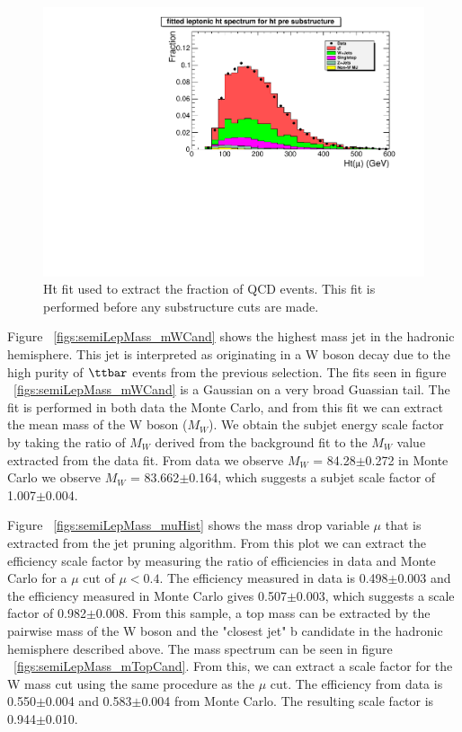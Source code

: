 \begin{figure}[htcb]
\centering
\includegraphics[width=1.0\textwidth]{figs/htLep3_comp.pdf}
\caption{Ht fit used to extract the fraction of QCD events.  This fit is performed before any substructure cuts are made.}
\label{figs:htLep3_comp}
\end{figure}


Figure ~\ref{figs:semiLepMass_mWCand} shows the highest mass jet in the hadronic hemisphere.  This jet is interpreted as originating in a W boson decay due to the
high purity of $\ttbar$ events from the previous selection.  The fits seen in figure ~\ref{figs:semiLepMass_mWCand} is a Gaussian on a very broad Guassian tail. 
The fit is performed
in both data the Monte Carlo, and from this fit we can extract the mean mass of the W boson ($M_W$).  We obtain the subjet energy scale factor by taking the 
ratio of 
$M_W$ derived from the background fit to the $M_W$ value extracted from the data fit.  From data we observe $M_W$ = 84.28$\pm$0.272 in Monte Carlo 
we observe $M_W$ = 83.662$\pm$0.164, which suggests a subjet scale factor of 1.007$\pm$0.004.

Figure ~\ref{figs:semiLepMass_muHist} shows the mass drop variable $\mu$ that is extracted from the jet pruning algorithm. From this plot we can extract the 
efficiency scale factor by measuring the ratio of efficiencies in data and Monte Carlo for a $\mu$ cut of $\mu < 0.4$.  The efficiency measured in data is 
0.498$\pm$0.003 and the efficiency measured in Monte Carlo gives 0.507$\pm$0.003, which suggests a scale factor of 0.982$\pm$0.008. From this sample, a top mass 
can be extracted by the pairwise mass of the W boson and the "closest jet" b candidate in the hadronic hemisphere described above.
The mass spectrum can be seen in figure ~\ref{figs:semiLepMass_mTopCand}.  From this, we can extract a scale factor for the W mass cut using the same procedure as 
the $\mu$ cut.
The efficiency from data is 0.550$\pm$0.004 and 0.583$\pm$0.004 from Monte Carlo.  The resulting scale factor is 0.944$\pm$0.010.  

